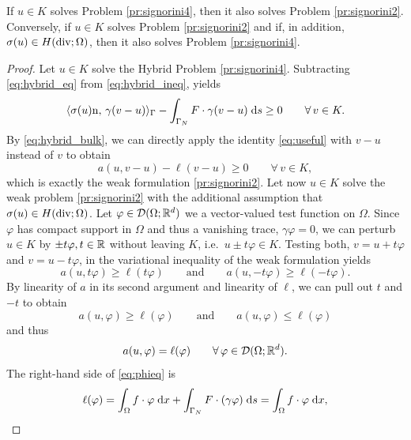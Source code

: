 \begin{proposition}
	If $u\in K$ solves Problem \ref{pr:signorini4}, then it also solves Problem \ref{pr:signorini2}. Conversely, if $u\in K$ solves Problem \ref{pr:signorini2} and if, in addition, $\sigma(u)\in H(\diver;\Omega)$, then it also solves Problem \ref{pr:signorini4}.
\end{proposition}
\begin{proof}
	Let $u\in K$ solve the Hybrid Problem \ref{pr:signorini4}. Subtracting \eqref{eq:hybrid_eq} from \eqref{eq:hybrid_ineq}, yields
	\begin{equation*}
		\langle \sigma(u)\mathrm{n},\,\gamma(v-u)\rangle_\Gamma - \int_{\Gamma_N} F\cdot \gamma(v-u)\;{{\mathrm{d}} s}\ge 0 \qquad\forall\,v\in K.
	\end{equation*}
	By \eqref{eq:hybrid_bulk}, we can directly apply the identity \eqref{eq:useful} with $v-u$ instead of $v$ to obtain
	\begin{equation*}
		a(u,v-u)-\ell(v-u)\ge 0 \qquad \forall\,v\in K,
	\end{equation*}
	which is exactly the weak formulation \ref{pr:signorini2}. Let now $u\in K$ solve the weak problem \ref{pr:signorini2} with the additional assumption that $\sigma(u)\in H(\diver;\Omega)$. Let $\varphi\in{\mathcal D}(\Omega;{\mathbb R}^d)$ we a vector-valued test function on $\Omega$. Since $\varphi$ has compact support in $\Omega$ and thus a vanishing trace, $\gamma\varphi = 0$, we can perturb $u\in K$ by $\pm t\varphi,t\in {\mathbb R}$ without leaving $K$, i.e.\ $u\pm t\varphi\in K$. Testing both, $v = u+t\varphi$ and $v = u-t\varphi$, in the variational inequality of the weak formulation yields
	\begin{equation*}
		a(u,t\varphi)\ge \ell(t\varphi)\qquad\text{and}\qquad a(u,-t\varphi)\ge\ell(-t\varphi).
	\end{equation*}
	By linearity of $a$ in its second argument and linearity of $\ell$, we can pull out $t$ and $-t$ to obtain
	\begin{equation*}
		a(u,\varphi)\ge\ell(\varphi)\qquad\text{and}\qquad a(u,\varphi)\le\ell(\varphi)
	\end{equation*}
	and thus
	\begin{equation}\label{eq:phieq}
		a(u,\varphi) = \ell(\varphi)\qquad\forall\,\varphi\in{\mathcal D}(\Omega;{\mathbb R}^d).
	\end{equation}
	The right-hand side of \eqref{eq:phieq} is
	\begin{equation*}
		\ell(\varphi) = \int_\Omega f\cdot\varphi\;\dx + \int_{\Gamma_N} F\cdot(\gamma\varphi)\;\ds = \int_\Omega f\cdot\varphi\;\dx,

\end{equation*}
\end{proof}
